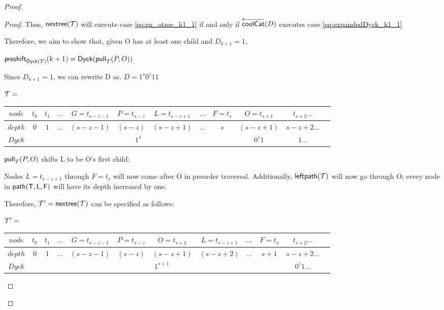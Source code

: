 \begin{proof}
\begin{proof}
    Thus, $\nextTree{T}$ will execute case \ref{eq:ex_otree_k1_1} if and only if $\coolCat{D}$ executes case \ref{eq:expandedDyck_k1_1}

    Therefore, we aim to show that, given O has at least one child and $D_{k+1}=1$,

    $\preshift{\dyck{T}}{k+1}=\dyck{\poppush[T]{P}{O}}$

    Since $D_{k+1}=1$, we can rewrite D as.
    $D=1^s0^z11$


    \noindent $\tree{T}=$
    \begin{center}
	\begin{tabular}{ |c|c|c|c|c|c|c|c|c|c|c|c| } 
	    \hline

	    $node$ & $t_0$ & $t_1$ & $\dots$ & $G=t_{s-z-1}$ & $P=t_{s-z}$ & $L=t_{s-z+1}$ & $\dots$ & $F=t_s$ & $O=t_{s+1}$ & $t_{s+2}\dots$ \\
	    \hline
	    $depth$ & $0$ & $1$ & $\dots$ & $(s-z-1)$ & $(s-z)$ & $(s-z+1)$ & $\dots$ & $s$  & $(s-z+1)$ & $s-z+2 \dots$\\
	    \hline
	    $Dyck$ &  &  \multicolumn{7}{|c|}{$1^s$} &  $0^{z}1$   & $1\dots$\\
	    \hline
	\end{tabular}
    \end{center}

    $\poppush[T]{P}{O}$
    shifts L to be O's first child:

    Nodes $L=t_{s-z+1}$ through $F=t_s$ will now come after O in preorder traversal.  Additionally, $\leftdown{T}$ will now go through O; every node in $\path{T}{L}{F}$ will have its depth increased by one.  

    Therefore, $\tree{T}'=\nextTree{T}$ can be specified as follows: 

    \noindent $\tree{T}'=$
    \begin{center}
	\begin{tabular}{ |c|c|c|c|c|c|c|c|c|c|c|c| } 
	    \hline

	    $node$ & $t_0$ & $t_1$ & $\dots$ & $G=t_{s-z-1}$ & $P=t_{s-z}$ & $O=t_{s+1}$ & $L=t_{s-z+1}$ & $\dots$ & $F=t_s$  & $t_{s+2}\dots$ \\
	    \hline
	    $depth$ & $0$ & $1$ & $\dots$ & $(s-z-1)$ & $(s-z)$ & $(s-z+1)$ & $(s-z+2)$ & $\dots$ & $s+1$  & $s-z+2 \dots$\\
	    \hline
	    $Dyck$ &  &  \multicolumn{8}{|c|}{$1^{s+1}$}  & $0^{z}1\dots$\\
	    \hline
	\end{tabular}
    \end{center}


\end{proof}
\end{proof}
